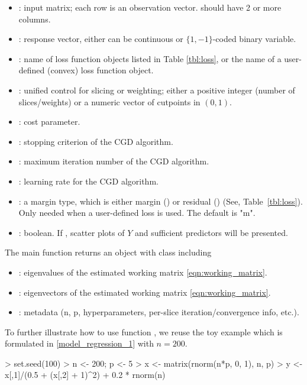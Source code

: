 \begin{itemize}[itemsep=.1mm]
\item {}: input matrix; each row is an observation vector.  should have 2 or more columns.
\item {}: response vector, either can be continuous or $\{1, -1\}$-coded binary variable.
\item {}: name of loss function objects listed in Table \ref{tbl:loss}, or the name of a user-defined (convex) loss function object. 
\item {}: unified control for slicing or weighting; either a positive integer (number of slices/weights) or a numeric vector of cutpoints in $(0,1)$.
\item {}: cost parameter.
\item {}: stopping criterion of the CGD algorithm.
\item {}: maximum iteration number of the CGD algorithm.
\item {}: learning rate for the CGD algorithm.
\item {}: a margin type, which is either margin () or residual () (See, Table~\ref{tbl:loss}). Only needed when a user-defined loss is used. The default is "m".
\item {}: boolean. If , scatter plots of $Y$ and sufficient predictors will be presented. 
\end{itemize}

The main function  returns an object with  class  including
\begin{itemize}
	\item {}: eigenvalues of the estimated working matrix \eqref{eqn:working_matrix}.
	\item {}: eigenvectors of the estimated working matrix \eqref{eqn:working_matrix}.
	\item {}: metadata (n, p, hyperparameters, per-slice iteration/convergence info, etc.).
\end{itemize}

To further illustrate how to use function , we reuse the toy example which is formulated in \eqref{model_regression_1} with $n=200$.

\begin{example}
 > set.seed(100) 
 > n <- 200; p <- 5 
 > x <- matrix(rnorm(n*p, 0, 1), n, p) 
 > y <- x[,1]/(0.5 + (x[,2] + 1)^2) + 0.2 * rnorm(n)   
\end{example}

